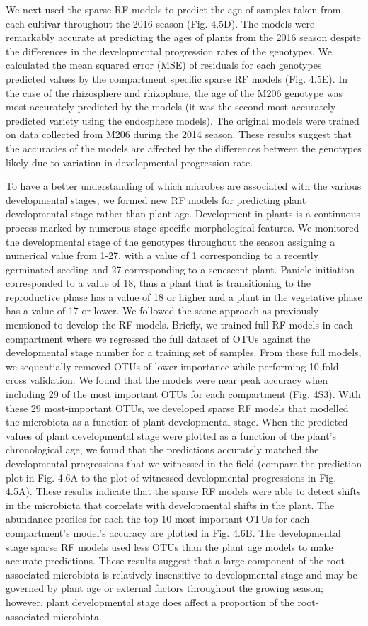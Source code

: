 We next used the sparse RF models to predict the age of samples taken from each cultivar throughout the 2016 season (Fig. 4.5D). The models were remarkably accurate at predicting the ages of plants from the 2016 season despite the differences in the developmental progression rates of the genotypes. We calculated the mean squared error (MSE) of residuals for each genotypes predicted values by the compartment specific sparse RF models (Fig. 4.5E). In the case of the rhizosphere and rhizoplane, the age of the M206 genotype was most accurately predicted by the models (it was the second most accurately predicted variety using the endosphere models). The original models were trained on data collected from M206 during the 2014 season. These results suggest that the accuracies of the models are affected by the differences between the genotypes likely due to variation in developmental progression rate. 

To have a better understanding of which microbes are associated with the various developmental stages, we formed new RF models for predicting plant developmental stage rather than plant age. Development in plants is a continuous process marked by numerous stage-specific morphological features. We monitored the developmental stage of the genotypes throughout the season assigning a numerical value from 1-27, with a value of 1 corresponding to a recently germinated seeding and 27 corresponding to a senescent plant. Panicle initiation corresponded to a value of 18, thus a plant that is transitioning to the reproductive phase has a value of 18 or higher and a plant in the vegetative phase has a value of 17 or lower. We followed the same approach as previously mentioned to develop the RF models. Briefly, we trained full RF models in each compartment where we regressed the full dataset of OTUs against the developmental stage number for a training set of samples. From these full models, we sequentially removed OTUs of lower importance while performing 10-fold cross validation. We found that the models were near peak accuracy when including 29 of the most important OTUs for each compartment (Fig. 4S3). With these 29 most-important OTUs, we developed sparse RF models that modelled the microbiota as a function of plant developmental stage. When the predicted values of plant developmental stage were plotted as a function of the plant's chronological age, we found that the predictions accurately matched the developmental progressions that we witnessed in the field (compare the prediction plot in Fig. 4.6A to the plot of witnessed developmental progressions in Fig. 4.5A). These results indicate that the sparse RF models were able to detect shifts in the microbiota that correlate with developmental shifts in the plant. The abundance profiles for each the top 10 most important OTUs for each compartment's model's accuracy are plotted in Fig. 4.6B. The developmental stage sparse RF models used less OTUs than the plant age models to make accurate predictions. These results suggest that a large component of the root-associated microbiota is relatively insensitive to developmental stage and may be governed by plant age or external factors throughout the growing season; however, plant developmental stage does affect a proportion of the root-associated microbiota.

